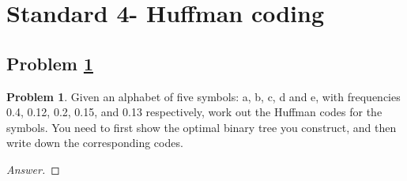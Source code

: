 \documentclass[11pt]{article}
\theoremstyle{definition}
\theoremstyle{definition}
\newtheorem{required}{Problem}
\theoremstyle{definition}
\begin{document}
\newpage
\section{Standard 4- Huffman coding}
\subsection{Problem \ref{Huffman}}
\begin{required} \label{Huffman}
Given an alphabet of five symbols: a, b, c, d and e, with frequencies 0.4, 0.12, 0.2, 0.15, and 0.13
respectively, work out the Huffman codes for the symbols. You need to first show the optimal binary tree you construct, and then write down the corresponding codes. \\
\end{required}



\begin{proof}[Answer]
\end{proof}



\end{document}
